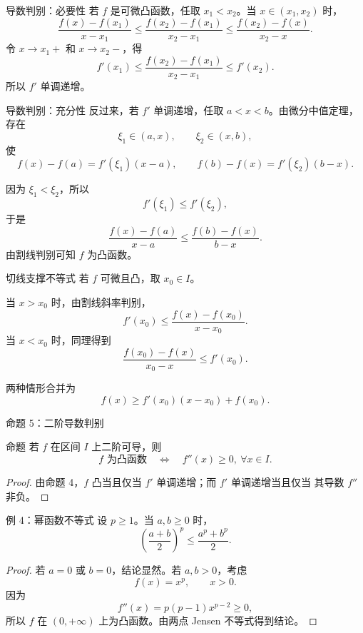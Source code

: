 \documentclass[aspectratio=169,11pt]{ctexbeamer}
\begin{document}
\begin{frame}{导数判别：必要性}
\small
若 $f$ 是可微凸函数，任取 $x_1<x_2$。当 $x\in(x_1,x_2)$ 时，
\[
  \frac{f(x)-f(x_1)}{x-x_1}
  \le
  \frac{f(x_2)-f(x_1)}{x_2-x_1}
  \le
  \frac{f(x_2)-f(x)}{x_2-x}.
\]
令 $x\to x_1+$ 和 $x\to x_2-$，得
\[
  f'(x_1)
  \le
  \frac{f(x_2)-f(x_1)}{x_2-x_1}
  \le
  f'(x_2).
\]
所以 $f'$ 单调递增。
\end{frame}

\begin{frame}{导数判别：充分性}
\small
反过来，若 $f'$ 单调递增，任取 $a<x<b$。由微分中值定理，
存在
\[
  \xi_1\in(a,x),\qquad \xi_2\in(x,b),
\]
使
\[
  f(x)-f(a)=f'(\xi_1)(x-a),\qquad
  f(b)-f(x)=f'(\xi_2)(b-x).
\]

因为 $\xi_1<\xi_2$，所以
\[
  f'(\xi_1)\le f'(\xi_2),
\]
于是
\[
  \frac{f(x)-f(a)}{x-a}
  \le
  \frac{f(b)-f(x)}{b-x}.
\]
由割线判别可知 $f$ 为凸函数。
\end{frame}

\begin{frame}{切线支撑不等式}
\small
若 $f$ 可微且凸，取 $x_0\in I$。

当 $x>x_0$ 时，由割线斜率判别，
\[
  f'(x_0)\le \frac{f(x)-f(x_0)}{x-x_0}.
\]
当 $x<x_0$ 时，同理得到
\[
  \frac{f(x_0)-f(x)}{x_0-x}\le f'(x_0).
\]

两种情形合并为
\[
  f(x)\ge f'(x_0)(x-x_0)+f(x_0).
\]
\end{frame}

\begin{frame}{命题 5：二阶导数判别}
\small
\begin{block}{命题}
若 $f$ 在区间 $I$ 上二阶可导，则
\[
  f \text{ 为凸函数}\quad \Longleftrightarrow\quad f''(x)\ge0,\ \forall x\in I.
\]
\end{block}

\begin{proof}
由命题 4，$f$ 凸当且仅当 $f'$ 单调递增；而 $f'$ 单调递增当且仅当
其导数 $f''$ 非负。
\end{proof}
\end{frame}

\begin{frame}{例 4：幂函数不等式}
\small
设 $p\ge1$。当 $a,b\ge0$ 时，
\[
  \left(\frac{a+b}{2}\right)^p
  \le
  \frac{a^p+b^p}{2}.
\]

\begin{proof}
若 $a=0$ 或 $b=0$，结论显然。若 $a,b>0$，考虑
\[
  f(x)=x^p,\qquad x>0.
\]
因为
\[
  f''(x)=p(p-1)x^{p-2}\ge0,
\]
所以 $f$ 在 $(0,+\infty)$ 上为凸函数。由两点 Jensen 不等式得到结论。
\end{proof}
\end{frame}
\end{document}
